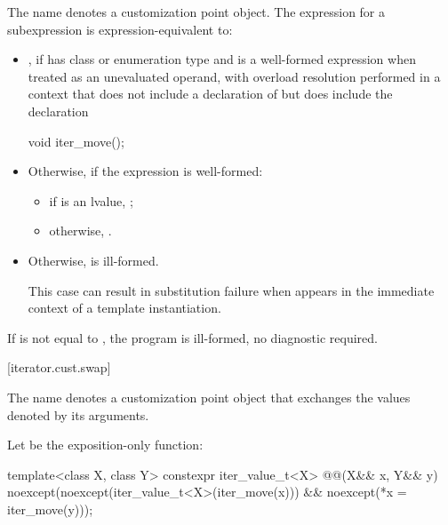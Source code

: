 %
\pnum
The name  denotes
a customization point object.
The expression  for a subexpression  is
expression-equivalent to:

\begin{itemize}
\item {}, if
 has class or enumeration type and
 is a well-formed expression when treated as an unevaluated operand,
with overload resolution performed in a context
that does not include a declaration of 
but does include the declaration
\begin{codeblock}
void iter_move();
\end{codeblock}

\item Otherwise, if the expression  is well-formed:
\begin{itemize}
\item if  is an lvalue, ;

\item otherwise, .
\end{itemize}

\item Otherwise,  is ill-formed.
\begin{note}
This case can result in substitution failure when 
appears in the immediate context of a template instantiation.
\end{note}
\end{itemize}

\pnum
If  is not equal to ,
the program is ill-formed, no diagnostic required.

[iterator.cust.swap]{}

%
\pnum
The name  denotes
a customization point object
that exchanges the values denoted by its
arguments.

\pnum
Let  be the exposition-only function:
\begin{itemdecl}
template<class X, class Y>
  constexpr iter_value_t<X> @@(X&& x, Y&& y)
    noexcept(noexcept(iter_value_t<X>(iter_move(x))) &&
             noexcept(*x = iter_move(y)));
\end{itemdecl}

